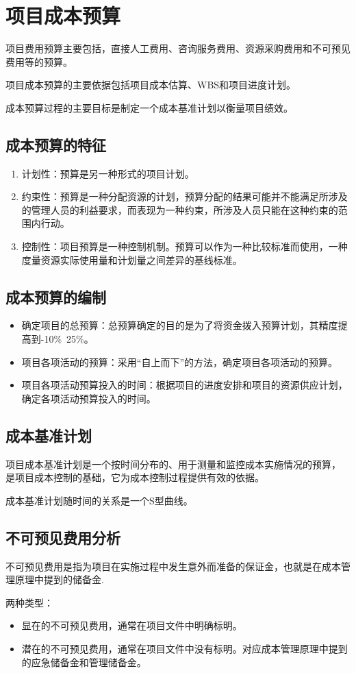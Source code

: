 \section{项目成本预算}
项目费用预算主要包括，直接人工费用、咨询服务费用、资源采购费用和不可预见费用等的预算。
\par 项目成本预算的主要依据包括项目成本估算、WBS和项目进度计划。
\par 成本预算过程的主要目标是制定一个成本基准计划以衡量项目绩效。
\subsection{成本预算的特征}
\begin{enumerate}
	\item 计划性：预算是另一种形式的项目计划。
	\item 约束性：预算是一种分配资源的计划，预算分配的结果可能并不能满足所涉及的管理人员的利益要求，而表现为一种约束，所涉及人员只能在这种约束的范围内行动。
	\item 控制性：项目预算是一种控制机制。预算可以作为一种比较标准而使用，一种度量资源实际使用量和计划量之间差异的基线标准。
\end{enumerate}
\subsection{成本预算的编制}
\begin{itemize}
	\item 确定项目的总预算：总预算确定的目的是为了将资金拨入预算计划，其精度提高到-10\%~25\%。
	\item 项目各项活动的预算：采用“自上而下”的方法，确定项目各项活动的预算。
	\item 项目各项活动预算投入的时间：根据项目的进度安排和项目的资源供应计划，确定各项活动预算投入的时间。
\end{itemize}
\subsection{成本基准计划}
项目成本基准计划是一个按时间分布的、用于测量和监控成本实施情况的预算，
是项目成本控制的基础，它为成本控制过程提供有效的依据。
\par 成本基准计划随时间的关系是一个S型曲线。
\subsection{不可预见费用分析}
不可预见费用是指为项目在实施过程中发生意外而准备的保证金，也就是在成本管理原理中提到的储备金.
\par 两种类型：
\begin{itemize}
	\item 显在的不可预见费用，通常在项目文件中明确标明。
	\item 潜在的不可预见费用，通常在项目文件中没有标明。对应成本管理原理中提到的应急储备金和管理储备金。
\end{itemize}
